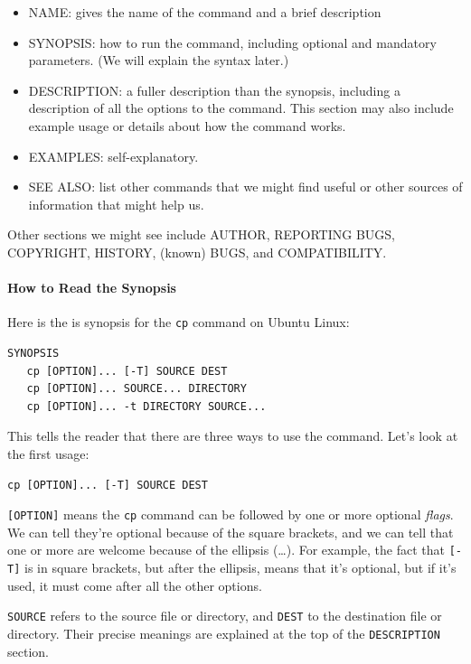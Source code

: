 \documentclass[]{book}
\newcommand{\gdef}[2]{\emph{#2}}
\begin{document}
\begin{itemize}
\item
  NAME: gives the name of the command and a brief description
\item
  SYNOPSIS: how to run the command, including optional and mandatory
  parameters. (We will explain the syntax later.)
\item
  DESCRIPTION: a fuller description than the synopsis, including a
  description of all the options to the command. This section may also
  include example usage or details about how the command works.
\item
  EXAMPLES: self-explanatory.
\item
  SEE ALSO: list other commands that we might find useful or other
  sources of information that might help us.
\end{itemize}

Other sections we might see include AUTHOR, REPORTING BUGS, COPYRIGHT,
HISTORY, (known) BUGS, and COMPATIBILITY.

\mbox{}\paragraph{How to Read the Synopsis}

Here is the is synopsis for the \texttt{cp} command on Ubuntu Linux:

\begin{verbatim}
SYNOPSIS
   cp [OPTION]... [-T] SOURCE DEST
   cp [OPTION]... SOURCE... DIRECTORY
   cp [OPTION]... -t DIRECTORY SOURCE...
\end{verbatim}

This tells the reader that there are three ways to use the command.
Let's look at the first usage:

\begin{verbatim}
cp [OPTION]... [-T] SOURCE DEST
\end{verbatim}

\texttt{{[}OPTION{]}} means the \texttt{cp} command can be followed by
one or more optional \gdef{g:command-line-flag}{flags}. We can tell
they're optional because of the square brackets, and we can tell that
one or more are welcome because of the ellipsis (\ldots{}). For example,
the fact that \texttt{{[}-T{]}} is in square brackets, but after the
ellipsis, means that it's optional, but if it's used, it must come after
all the other options.

\texttt{SOURCE} refers to the source file or directory, and
\texttt{DEST} to the destination file or directory. Their precise
meanings are explained at the top of the \texttt{DESCRIPTION} section.
\end{document}
